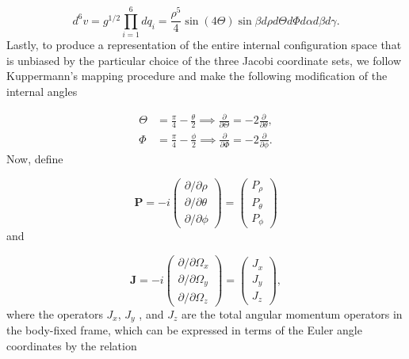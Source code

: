 \begin{equation}
d^6v = g^{1/2}\prod_{i=1}^{6} d q_i = \frac{\rho^5}{4}\sin(4\Theta)\sin\beta d\rho d\Theta d\Phi d\alpha d\beta d\gamma.
\end{equation}
Lastly, to produce a representation of the entire internal configuration
space that is unbiased by the particular choice of the three Jacobi coordinate sets, we follow Kuppermann's mapping procedure \cite{KUPPERMANN1975374} and make the following modification of the internal angles

\begin{equation}
\begin{aligned}
\Theta &= \frac{\pi}{4}-\frac{\theta}{2} \implies \frac{\partial}{\partial\Theta} = -2\frac{\partial}{\partial\theta},\\
\Phi &= \frac{\pi}{4}-\frac{\phi}{2} \implies \frac{\partial}{\partial\Phi} = -2\frac{\partial}{\partial\phi}.
\end{aligned}
\end{equation}
Now, define

\begin{equation}
\mathbf{P} = 
-i
\begin{pmatrix}
\partial/\partial\rho\\
\partial/\partial\theta\\
\partial/\partial\phi
\end{pmatrix}
=
\begin{pmatrix}
P_{\rho}\\
P_{\theta}\\
P_{\phi}
\end{pmatrix}
\end{equation}
and

\begin{equation}\label{eq:J_vector}
\mathbf{J} = 
-i
\begin{pmatrix}
\partial/\partial\Omega_x\\
\partial/\partial\Omega_y\\
\partial/\partial\Omega_z
\end{pmatrix}
=
\begin{pmatrix}
J_x\\
J_y\\
J_z
\end{pmatrix},
\end{equation}
where the operators $J_x$, $J_y$ , and $J_z$ are the total angular momentum operators in the body-fixed frame, which can be expressed in terms of the Euler angle coordinates by the relation

